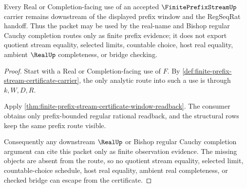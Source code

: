 \begin{theorem}
\label{thm:finite-prefix-stream-certificate-nonescape}
Every Real or Completion-facing use of an accepted $\FinitePrefixStreamUp$ carrier remains downstream of the displayed prefix window and the RegSeqRat handoff. Thus the packet may be used by the real-name and Bishop regular Cauchy completion routes only as finite prefix evidence; it does not export quotient stream equality, selected limits, countable choice, host real equality, ambient $\RealUp$ completeness, or bridge checking.
\end{theorem}
\begin{proof}
Start with a Real or Completion-facing use of $F$. By \autoref{def:finite-prefix-stream-certificate-carrier}, the only analytic route into such a use is through $k,W,D,R$.

Apply \autoref{thm:finite-prefix-stream-certificate-window-readback}. The consumer obtains only prefix-bounded regular rational readback, and the structural rows keep the same prefix route visible.

Consequently any downstream $\RealUp$ or Bishop regular Cauchy completion argument can cite this packet only as finite observation evidence. The missing objects are absent from the route, so no quotient stream equality, selected limit, countable-choice schedule, host real equality, ambient real completeness, or checked bridge can escape from the certificate.
\end{proof}

